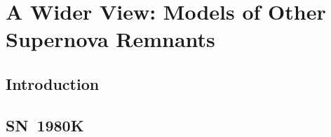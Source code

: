 \chapter{A Wider View: Models of Other Supernova Remnants}\label{chp:chp6}

%
%



\section{Introduction}
\section{SN~1980K}

